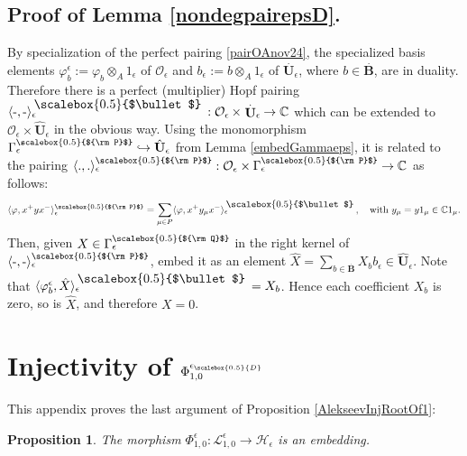 \documentclass[11pt]{amsart}
\newtheorem{prop}[teo]{Proposition}
\newcommand{\e}{\epsilon}
\newcommand{\Q}{{\scalebox{0.5}{${\rm Q}$}}}
\newcommand{\Pup}{{\scalebox{0.5}{${\rm P}$}}}
\newcommand{\smallbullet}{%
\vcenter{\hbox{\,\scalebox{0.5}{$\bullet$}\,}}
}
\begin{document}
\subsection{Proof of Lemma \ref{nondegpairepsD}.}\label{sec:pflemnondegpair} By specialization of the perfect pairing \eqref{pairOAnov24}, the specialized basis elements $\varphi_b^{\epsilon} := \varphi_b \otimes_A 1_\e$ of ${\mathcal O}_\epsilon$ and $b_{\epsilon}:=  b\otimes_A 1_\e$ of $\stackrel{.}{\mathbf{U}}_\epsilon$, where $b\in \stackrel{.}{\mathbf{B}}$,  are in duality. Therefore there is a perfect (multiplier) Hopf pairing $\langle \text{-},\text{-} \rangle_\epsilon^{\smallbullet}:{\mathcal O}_\epsilon\,\times \stackrel{.}{\mathbf{U}}_\epsilon \: \to {\mathbb C}$ which can be extended to ${\mathcal O}_\epsilon\times \hat{\mathbf{U}}_\e$ in the obvious way. Using the monomorphism $\Gamma_\e^\Pup\hookrightarrow \hat{{\mathbf{U}}}_\e$ from Lemma \ref{embedGammaeps}, it is related to the pairing $\langle.,.\rangle_\e^\Pup : \mathcal{O}_\e \times \Gamma_\e^\Pup \to \mathbb{C}$ as follows:
\begin{equation}\label{relpairnov25}\langle \varphi , x^+ y x^-\rangle_\e^\Pup =\sum_{\mu\in P}\langle \varphi , x^+ y_\mu x^- \rangle_\e^{\smallbullet}, \quad \text{with } y_\mu = y1_\mu \in \mathbb{C}1_\mu.
\end{equation}
Then, given $X\in \Gamma_\epsilon^\Q$ in the right kernel of $\langle \text{-},\text{-} \rangle_\epsilon^\Pup$, embed it as an element $\textstyle \hat{X}=\sum_{b\in \stackrel{.}{\mathbf{B}}} X_b b_{\epsilon} \in \hat{{\mathbf{U}}}_\e$. Note that $\langle\varphi_{b}^{\epsilon}, \hat{X}\rangle^{\smallbullet}_\e = X_b$. Hence each coefficient $X_b$ is zero, so is $\hat{X}$, and therefore $X=0$.

\section{Injectivity of \texorpdfstring{$\Phi_{1,0}^{\epsilon_{\scalebox{0.5}{D}}}$}{the morphism to the Heisenberg double}}\label{AppPhiinj}

This appendix proves the last argument of Proposition \ref{AlekseevInjRootOf1}:

\begin{prop}\label{Phigneinjproof} The morphism $\Phi_{1,0}^{\e} : \mathcal{L}_{1,0}^{\e} \to \mathcal{H}_{\e}$ is an embedding. 
\end{prop}
\end{document}

